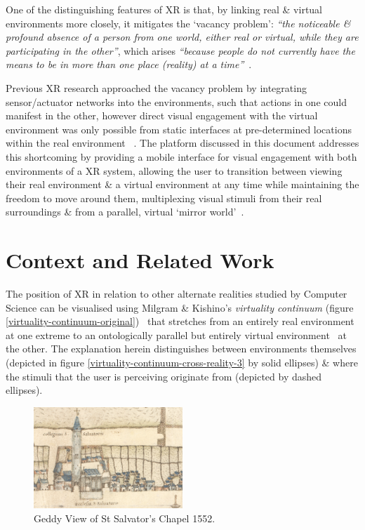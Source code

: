 \documentclass[conference]{acmsiggraph}
\begin{document}
One of the distinguishing features of XR is that, by linking real \& virtual environments more closely, it mitigates the `vacancy problem': \textit{``the noticeable \& profound absence of a person from one world, either real or virtual, while they are participating in the other''}, which arises \textit{``because people do not currently have the means to be in more than one place (reality) at a time''}~\cite{Lifton2007a}.

Previous XR research approached the vacancy problem by integrating sensor/actuator networks into the environments, such that actions in one could manifest in the other, however direct visual engagement with the virtual environment was only possible from static interfaces at pre-determined locations within the real environment~\cite{Lifton2007a} \cite{Dublon2011}. The platform discussed in this document addresses this shortcoming by providing a mobile interface for visual engagement with both environments of a XR system, allowing the user to transition between viewing their real environment \& a virtual environment at any time while maintaining the freedom to move around them, multiplexing visual stimuli from their real surroundings \& from a parallel, virtual `mirror world'~\cite{Gelernter1993}.

\section{Context and Related Work}
The position of XR in relation to other alternate realities studied by Computer Science can be visualised using Milgram \& Kishino's \textit{virtuality continuum} (figure \ref{virtuality-continuum-original})~\cite{Milgram1994} that stretches from an entirely real environment at one extreme to an ontologically parallel but entirely virtual environment~\cite{Qvortrup2002} at the other. The explanation herein distinguishes between environments themselves (depicted in figure \ref{virtuality-continuum-cross-reality-3} by solid ellipses) \& where the stimuli that the user is perceiving originate from (depicted by dashed ellipses).

\begin{figure}[t]
	\begin{center}
		\includegraphics[width=0.5\textwidth]{images/sally.png}
		\caption{Geddy View of St Salvator's Chapel 1552.}
		\label{sally}
	\end{center}
\end{figure}
\end{document}
